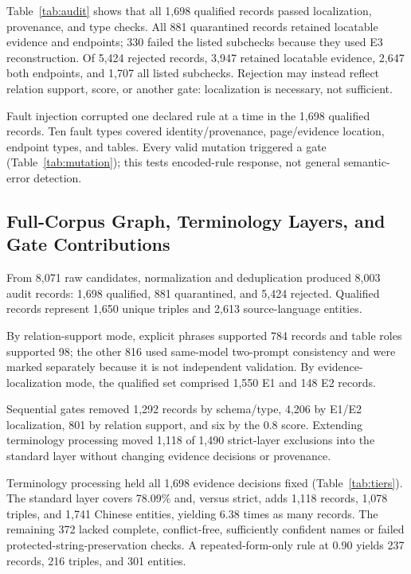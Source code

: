 \documentclass[conference,a4paper]{IEEEtran}
\begin{document}
Table~\ref{tab:audit} shows that all 1,698 qualified records passed localization, provenance, and type checks. All 881 quarantined records retained locatable evidence and endpoints; 330 failed the listed subchecks because they used E3 reconstruction. Of 5,424 rejected records, 3,947 retained locatable evidence, 2,647 both endpoints, and 1,707 all listed subchecks. Rejection may instead reflect relation support, score, or another gate: localization is necessary, not sufficient.

Fault injection corrupted one declared rule at a time in the 1,698 qualified records. Ten fault types covered identity/provenance, page/evidence location, endpoint types, and tables. Every valid mutation triggered a gate (Table~\ref{tab:mutation}); this tests encoded-rule response, not general semantic-error detection.

\subsection{Full-Corpus Graph, Terminology Layers, and Gate Contributions}

From 8,071 raw candidates, normalization and deduplication produced 8,003 audit records: 1,698 qualified, 881 quarantined, and 5,424 rejected. Qualified records represent 1,650 unique triples and 2,613 source-language entities.

By relation-support mode, explicit phrases supported 784 records and table roles supported 98; the other 816 used same-model two-prompt consistency and were marked separately because it is not independent validation. By evidence-localization mode, the qualified set comprised 1,550 E1 and 148 E2 records.

Sequential gates removed 1,292 records by schema/type, 4,206 by E1/E2 localization, 801 by relation support, and six by the 0.8 score. Extending terminology processing moved 1,118 of 1,490 strict-layer exclusions into the standard layer without changing evidence decisions or provenance.

Terminology processing held all 1,698 evidence decisions fixed (Table~\ref{tab:tiers}). The standard layer covers 78.09\% and, versus strict, adds 1,118 records, 1,078 triples, and 1,741 Chinese entities, yielding 6.38 times as many records. The remaining 372 lacked complete, conflict-free, sufficiently confident names or failed protected-string-preservation checks. A repeated-form-only rule at 0.90 yields 237 records, 216 triples, and 301 entities.
\end{document}
